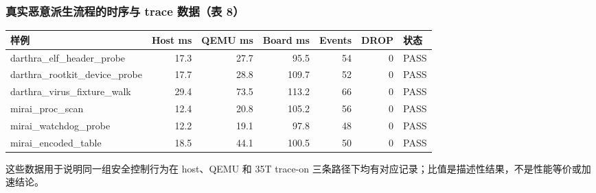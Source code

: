 \documentclass[aspectratio=169,10pt]{beamer}
\begin{document}
\begin{frame}
  \frametitle{真实恶意派生流程的时序与 trace 数据（表 8）}
  \vskip0.05cm
  \begin{center}\scriptsize
  \renewcommand{\arraystretch}{1.10}
  \setlength{\tabcolsep}{3.5pt}
  \begin{tabularx}{0.98\linewidth}{@{}L{3.25cm}rrr r r L{1.25cm}@{}}
    \toprule
    \textbf{样例} & \textbf{Host ms} & \textbf{QEMU ms} & \textbf{Board ms} & \textbf{Events} & \textbf{DROP} & \textbf{状态} \\
    \midrule
    darthra\_elf\_header\_probe & 17.3 & 27.7 & 95.5 & 54 & 0 & PASS \\
    darthra\_rootkit\_device\_probe & 17.7 & 28.8 & 109.7 & 52 & 0 & PASS \\
    darthra\_virus\_fixture\_walk & 29.4 & 73.5 & 113.2 & 66 & 0 & PASS \\
    mirai\_proc\_scan & 12.4 & 20.8 & 105.2 & 56 & 0 & PASS \\
    mirai\_watchdog\_probe & 12.2 & 19.1 & 97.8 & 48 & 0 & PASS \\
    mirai\_encoded\_table & 18.5 & 44.1 & 100.5 & 50 & 0 & PASS \\
    \bottomrule
  \end{tabularx}
  \end{center}

  \vskip0.08cm
  \small
  这些数据用于说明同一组安全控制行为在 host、QEMU 和 35T trace-on 三条路径下均有对应记录；比值是描述性结果，不是性能等价或加速结论。
\end{frame}
\end{document}
